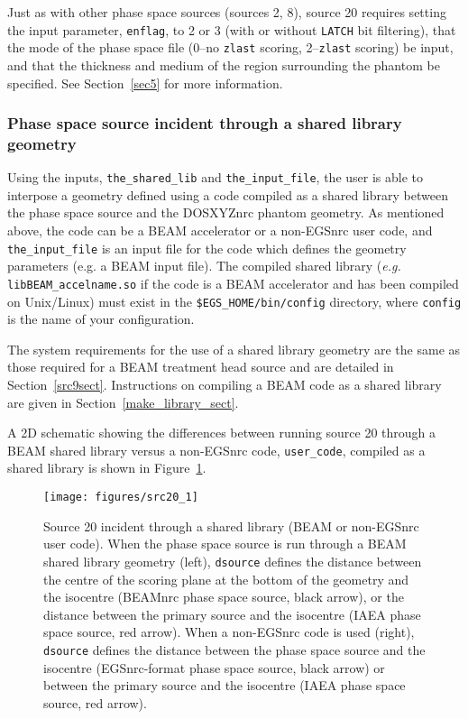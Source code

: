 \documentclass[12pt,twoside]{article}      %
\newcommand{\indexm}[1]{\index{#1}}
\begin{document}
Just as with other phase space sources (sources 2, 8), source 20 requires setting the input parameter, {\tt enflag}, to 2 or 3
(with or without {\tt LATCH} bit filtering), that the mode of the phase space file (0--no {\tt zlast} scoring, 2--{\tt zlast} scoring) be
input, and that the thickness and medium of the region surrounding the phantom be specified.  See Section~\ref{sec5} for more information.

\subsubsection{Phase space source incident through a shared library geometry}

\indexm{the\_shared\_lib}\indexm{the\_input\_file}
Using the inputs, {\tt the\_shared\_lib} and {\tt the\_input\_file}, the user is able to interpose
a geometry defined using a code compiled as a shared library between the phase space source and the DOSXYZnrc
phantom geometry.  As mentioned above, the code can be a BEAM accelerator or a non-EGSnrc user code, and
{\tt the\_input\_file} is an input file for the code which defines the geometry parameters (e.g. a BEAM input file).
The compiled shared library ({\it e.g.} {\tt libBEAM\_accelname.so} if the code is a BEAM accelerator and has been compiled
on Unix/Linux) must exist in the {\tt \$EGS\_HOME/bin/config} directory, where {\tt config} is the name of your
configuration.

The system requirements for the use of a shared library geometry are the same as those required for
a BEAM treatment head source and are detailed in Section~\ref{src9sect}.  Instructions on compiling
a BEAM code as a shared library are given in Section~\ref{make_library_sect}.

A 2D schematic showing the differences between running source 20 through a BEAM shared library versus a
non-EGSnrc code, {\tt user\_code}, compiled as a shared library is shown in Figure~\ref{fig_src20_1}.

\begin{figure}[htbp]
\begin{center}
\hspace*{-1cm}\texttt{[image: figures/src20\_1]}
\caption{Source 20 incident through a shared library (BEAM or non-EGSnrc user code).  When
the phase space source is run through a BEAM shared library geometry (left), {\tt dsource} defines
the distance between the centre of the scoring plane at the bottom of the geometry and the isocentre (BEAMnrc
phase space source, black arrow), or the distance between the primary source and the isocentre (IAEA phase
space source, red arrow).
When a non-EGSnrc code is used (right), {\tt dsource} defines the distance between the phase space source
and the isocentre (EGSnrc-format phase space source, black arrow) or between the primary source and the isocentre (IAEA phase space
source, red arrow).}
\label{fig_src20_1}
\end{center}
\end{figure}
\end{document}
